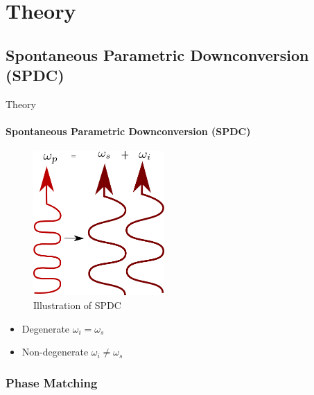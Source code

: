 \documentclass[serif,8pt]{beamer}
\begin{document}
\section{Theory}
\subsection{Spontaneous Parametric Downconversion (SPDC)}

\begin{frame}{Theory}
	\framesubtitle{Spontaneous Parametric Downconversion (SPDC)}
	\begin{minipage}[l]{0.60\textwidth}
		\begin{figure}
			\begin{center}
				\includegraphics[width=5cm]{SPDC.png}
			\end{center}
			\caption{Illustration of SPDC}
			\label{fig:SPDC}
		\end{figure}
	\end{minipage}
	\begin{minipage}[r]{0.35\textwidth}
		\begin{itemize}
			\item Degenerate $\omega_i = \omega_s$
			\item Non-degenerate $\omega_i \ne \omega_s$
		\end{itemize}
	\end{minipage}
\end{frame}

\subsubsection{Phase Matching}
\end{document}

